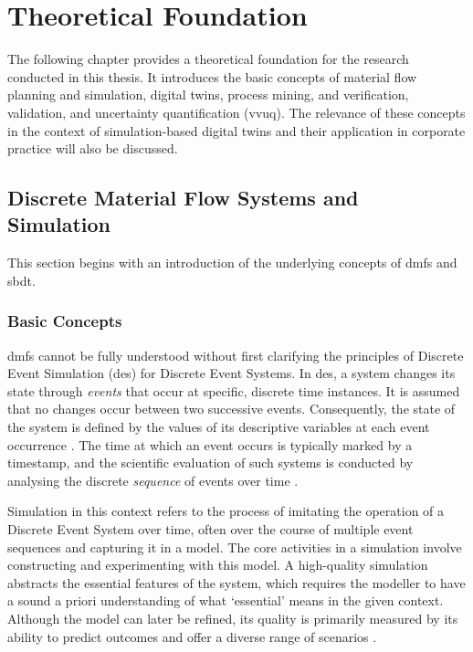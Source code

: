 \chapter{Theoretical Foundation}
\label{chap:theory}

The following chapter provides a theoretical foundation for the research conducted in this thesis. It introduces the basic concepts of material flow planning and simulation, digital twins, process mining, and verification, validation, and uncertainty quantification (\gls{vvuq}). The relevance of these concepts in the context of simulation-based digital twins and their application in corporate practice will also be discussed.


\section{Discrete Material Flow Systems and Simulation}
This section begins with an introduction of the underlying concepts of \gls{dmfs} and \gls{sbdt}.
\label{sec:material-flow}

\subsection{Basic Concepts}
\gls{dmfs} cannot be fully understood without first clarifying the principles of Discrete Event Simulation (\gls{des}) for Discrete Event Systems. In \gls{des}, a system changes its state through \textit{events} that occur at specific, discrete time instances. It is assumed that no changes occur between two successive events. Consequently, the state of the system is defined by the values of its descriptive variables at each event occurrence \autocite{varga2001discrete}. The time at which an event occurs is typically marked by a timestamp, and the scientific evaluation of such systems is conducted by analysing the discrete \textit{sequence} of events over time \autocite{robinson2014simulation}.

Simulation in this context refers to the process of imitating the operation of a Discrete Event System over time, often over the course of multiple event sequences and capturing it in a model. The core activities in a simulation involve constructing and experimenting with this model. A high-quality simulation abstracts the essential features of the system, which requires the modeller to have a sound a priori understanding of what `essential' means in the given context. Although the model can later be refined, its quality is primarily measured by its ability to predict outcomes and offer a diverse range of scenarios \autocite{maria1997introduction}.

